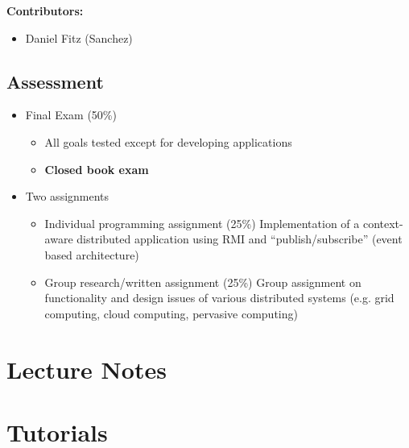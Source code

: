 \documentclass[12pt, a4paper]{report}
\begin{document}
	\tableofcontents
	\vspace{2em}
	\textbf{Contributors:}
	\begin{itemize}
		\item Daniel Fitz (Sanchez)
	\end{itemize}
	\section{Assessment}
	\begin{itemize}
		\item Final Exam (50\%)
		\begin{itemize}
			\item All goals tested except for developing applications
			\item\textbf{Closed book exam}
		\end{itemize}
		\item Two assignments
		\begin{itemize}
			\item Individual programming assignment (25\%)
			\subitem Implementation of a context-aware distributed application using RMI and ``publish/subscribe'' (event based architecture)
			\item Group research/written assignment (25\%)
			\subitem Group assignment on functionality and design issues of various distributed systems (e.g. grid computing, cloud computing, pervasive computing)
		\end{itemize}
	\end{itemize}

	\newpage

\begin{multicols*}{2}

\chapter{Lecture Notes}





\chapter{Tutorials}


\end{multicols*}
\end{document}
